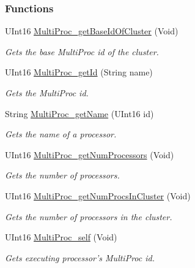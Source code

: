 \subsubsection*{Functions}
\begin{DoxyCompactItemize}
\item 
UInt16 \hyperlink{_multi_proc_8h_a147f37c02626ab600bea516211eac50e}{MultiProc\_\-getBaseIdOfCluster} (Void)
\begin{DoxyCompactList}\small\item\em Gets the base MultiProc id of the cluster. \item\end{DoxyCompactList}\item 
UInt16 \hyperlink{_multi_proc_8h_ad690d4b42978e95cb57d9244bb8e6959}{MultiProc\_\-getId} (String name)
\begin{DoxyCompactList}\small\item\em Gets the MultiProc id. \item\end{DoxyCompactList}\item 
String \hyperlink{_multi_proc_8h_aa16e1bb4fd1eb6f968d6ba47c65f88e0}{MultiProc\_\-getName} (UInt16 id)
\begin{DoxyCompactList}\small\item\em Gets the name of a processor. \item\end{DoxyCompactList}\item 
UInt16 \hyperlink{_multi_proc_8h_a75e5d953ef6828ef03c2eb8d70dda82d}{MultiProc\_\-getNumProcessors} (Void)
\begin{DoxyCompactList}\small\item\em Gets the number of processors. \item\end{DoxyCompactList}\item 
UInt16 \hyperlink{_multi_proc_8h_a74dfbb6a7dbf74b2a9be6c041a13d8bd}{MultiProc\_\-getNumProcsInCluster} (Void)
\begin{DoxyCompactList}\small\item\em Gets the number of processors in the cluster. \item\end{DoxyCompactList}\item 
UInt16 \hyperlink{_multi_proc_8h_a2cb11a79ed2c6cbd6ea6b88b63903124}{MultiProc\_\-self} (Void)
\begin{DoxyCompactList}\small\item\em Gets executing processor's MultiProc id. \item\end{DoxyCompactList}\item 

\end{DoxyCompactItemize}
